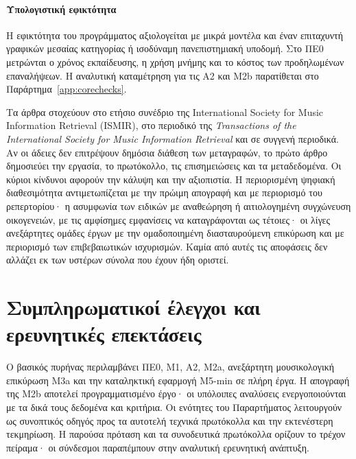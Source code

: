 \documentclass[a4paper]{article}
\begin{document}
\paragraph{Υπολογιστική εφικτότητα}
Η εφικτότητα του προγράμματος αξιολογείται με μικρά μοντέλα και έναν επιταχυντή γραφικών μεσαίας κατηγορίας ή ισοδύναμη πανεπιστημιακή υποδομή. Στο ΠΕ0 μετρώνται ο χρόνος εκπαίδευσης, η χρήση μνήμης και το κόστος των προδηλωμένων επαναλήψεων. Η αναλυτική καταμέτρηση για τις Α2 και Μ2b παρατίθεται στο Παράρτημα~\ref{app:corechecks}.

Τα άρθρα στοχεύουν στο ετήσιο συνέδριο της International Society for Music Information Retrieval (ISMIR), στο περιοδικό της \emph{Transactions of the International Society for Music Information Retrieval} και σε συγγενή περιοδικά. Αν οι άδειες δεν επιτρέψουν δημόσια διάθεση των μεταγραφών, το πρώτο άρθρο δημοσιεύει την εργασία, το πρωτόκολλο, τις επισημειώσεις και τα μεταδεδομένα. Οι κύριοι κίνδυνοι αφορούν την κάλυψη και την αξιοπιστία. Η περιορισμένη ψηφιακή διαθεσιμότητα αντιμετωπίζεται με την πρώιμη απογραφή και με περιορισμό του ρεπερτορίου· η ασυμφωνία των ειδικών με αναθεώρηση ή αιτιολογημένη συγχώνευση οικογενειών, με τις αμφίσημες εμφανίσεις να καταγράφονται ως τέτοιες· οι λίγες ανεξάρτητες ομάδες έργων με την ομαδοποιημένη διασταυρούμενη επικύρωση και με περιορισμό των επιβεβαιωτικών ισχυρισμών. Καμία από αυτές τις αποφάσεις δεν αλλάζει εκ των υστέρων σύνολα που έχουν ήδη οριστεί.

\appendix
\section{Συμπληρωματικοί έλεγχοι και ερευνητικές επεκτάσεις}\label{app:extensions}
Ο βασικός πυρήνας περιλαμβάνει ΠΕ0, Μ1, Α2, Μ2a, ανεξάρτητη μουσικολογική επικύρωση Μ3a και την καταληκτική εφαρμογή Μ5-min σε πλήρη έργα. Η απογραφή της Μ2b αποτελεί προγραμματισμένο έργο· οι υπόλοιπες αναλύσεις ενεργοποιούνται με τα δικά τους δεδομένα και κριτήρια. Οι ενότητες του Παραρτήματος λειτουργούν ως συνοπτικός οδηγός προς τα αυτοτελή τεχνικά πρωτόκολλα και την εκτενέστερη τεκμηρίωση. Η παρούσα πρόταση και τα συνοδευτικά πρωτόκολλα ορίζουν το τρέχον πείραμα· οι σύνδεσμοι παραπέμπουν στην αναλυτική ερευνητική ανάπτυξη.
\end{document}
